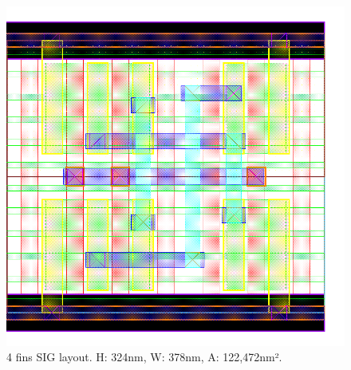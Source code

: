 \documentclass[pgmicro,diss,english]{iiufrgs}
\begin{document}
\begin{figure}[]
\centering
\includegraphics[width=\textwidth,height=\textheight,keepaspectratio]{SIG4F.png}
\caption{4 fins SIG layout. H: 324nm, W: 378nm, A: 122,472nm².}
\label{fig:SIG4F}
\end{figure}
\end{document}
